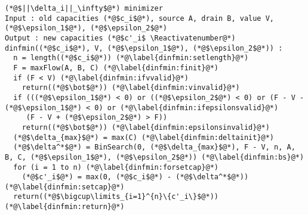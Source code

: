 {}
\Suppressnumber
\begin{lstlisting}[label=dinf, style=numbers]
(*@$||\delta_i||_\infty$@*) minimizer
Input : old capacities (*@$c_i$@*), source A, drain B, value V, (*@$\epsilon_1$@*), (*@$\epsilon_2$@*)
Output : new capacities (*@$c'_i$ \Reactivatenumber@*)
dinfmin((*@$c_i$@*), V, (*@$\epsilon_1$@*), (*@$\epsilon_2$@*)) :
  n = length((*@$c_i$@*)) (*@\label{dinfmin:setlength}@*)
  F = maxFlow(A, B, C) (*@\label{dinfmin:finit}@*)
  if (F < V) (*@\label{dinfmin:ifvvalid}@*)
    return((*@$\bot$@*)) (*@\label{dinfmin:vinvalid}@*)
  if (((*@$\epsilon_1$@*) < 0) or ((*@$\epsilon_2$@*) < 0) or (F - V - (*@$\epsilon_1$@*) < 0) or (*@\label{dinfmin:ifepsilonsvalid}@*)
     (F - V + (*@$\epsilon_2$@*) > F))
    return((*@$\bot$@*)) (*@\label{dinfmin:epsilonsinvalid}@*)
  (*@$\delta_{max}$@*) = max(C) (*@\label{dinfmin:deltainit}@*)
  (*@$\delta^*$@*) = BinSearch(0, (*@$\delta_{max}$@*), F - V, n, A, B, C, (*@$\epsilon_1$@*), (*@$\epsilon_2$@*)) (*@\label{dinfmin:bs}@*)
  for (i = 1 to n) (*@\label{dinfmin:forsetcap}@*)
    (*@$c'_i$@*) = max(0, (*@$c_i$@*) - (*@$\delta^*$@*)) (*@\label{dinfmin:setcap}@*)
  return((*@$\bigcup\limits_{i=1}^{n}\{c'_i\}$@*)) (*@\label{dinfmin:return}@*)
\end{lstlisting}
